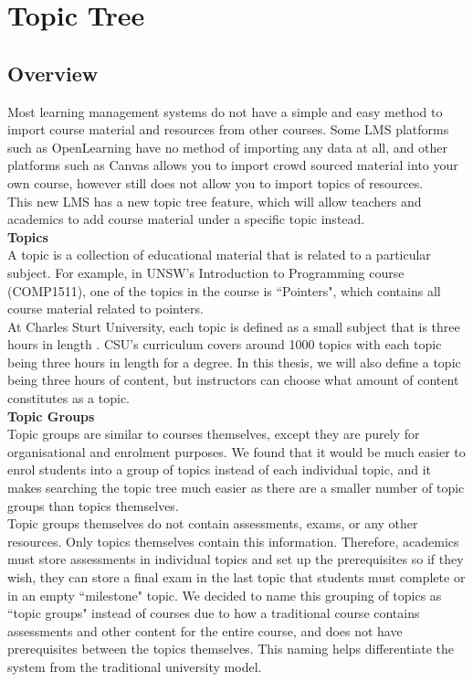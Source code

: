 \section{Topic Tree}
\subsection{Overview}
Most learning management systems do not have a simple and easy method to import course material and resources from other courses. Some LMS platforms such as OpenLearning have no method of importing any data at all, and other platforms such as Canvas allows you to import crowd sourced material into your own course, however still does not allow you to import topics of resources. \\

This new LMS has a new topic tree feature, which will allow teachers and academics to add course material under a specific topic instead.\\

\textbf{Topics} \\
A topic is a collection of educational material that is related to a particular subject. For example, in UNSW's Introduction to Programming course (COMP1511), one of the topics in the course is ``Pointers", which contains all course material related to pointers.\\

At Charles Sturt University, each topic is defined as a small subject that is three hours in length \cite{csutopictree}. CSU's curriculum covers around 1000 topics with each topic being three hours in length for a degree. In this thesis, we will also define a topic being three hours of content, but instructors can choose what amount of content constitutes as a topic.\\

\textbf{Topic Groups} \\
Topic groups are similar to courses themselves, except they are purely for organisational and enrolment purposes. We found that it would be much easier to enrol students into a group of topics instead of each individual topic, and it makes searching the topic tree much easier as there are a smaller number of topic groups than topics themselves. \\

Topic groups themselves do not contain assessments, exams, or any other resources. Only topics themselves contain this information. Therefore, academics must store assessments in individual topics and set up the prerequisites so if they wish, they can store a final exam in the last topic that students must complete or in an empty ``milestone" topic. We decided to name this grouping of topics as ``topic groups" instead of courses due to how a traditional course contains assessments and other content for the entire course, and does not have prerequisites between the topics themselves. This naming helps differentiate the system from the traditional university model.\\

